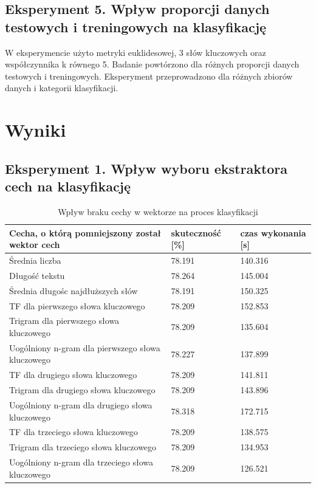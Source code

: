 \documentclass{classrep}
\begin{document}
\subsection{Eksperyment 5. Wpływ proporcji danych testowych i treningowych na klasyfikację}
W eksperymencie użyto metryki euklidesowej, 3 słów kluczowych oraz współczynnika k równego 5. Badanie powtórzono dla różnych proporcji danych testowych i treningowych. Eksperyment przeprowadzono dla różnych zbiorów danych i kategorii klasyfikacji.

\newpage
\section{Wyniki}
\subsection{Eksperyment 1. Wpływ wyboru ekstraktora cech na klasyfikację}
\begin{table}[H]
	\caption{Wpływ braku cechy w wektorze na proces klasyfikacji}
	\begin{tabular}{l|l|l}
		Cecha, o którą pomniejszony został wektor cech& skuteczność [\%]& czas wykonania [s]\\
		\hline
		Średnia liczba &78.191&140.316\\
		Długość tekstu &78.264&145.004\\
		Średnia długośc najdłuższych słów &78.191&150.325\\
		TF dla pierwszego słowa kluczowego &78.209&152.853\\
		Trigram dla pierwszego słowa kluczowego &78.209&135.604\\
		Uogólniony n-gram dla pierwszego słowa kluczowego &78.227&137.899\\
		TF dla drugiego słowa kluczowego &78.209&141.811\\
		Trigram dla drugiego słowa kluczowego &78.209&143.896\\
		Uogólniony n-gram dla drugiego słowa kluczowego &78.318&172.715\\
		TF dla trzeciego słowa kluczowego &78.209&138.575\\
		Trigram dla trzeciego słowa kluczowego &78.209&134.953\\
		Uogólniony n-gram dla trzeciego słowa kluczowego &78.209&126.521\\
	\end{tabular}
\end{table}
\end{document}
